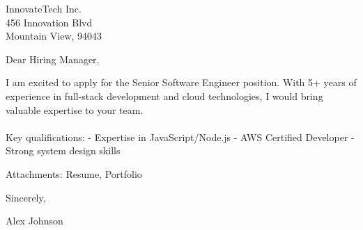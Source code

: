 \documentclass[11pt,a4paper]{letter}
\begin{document}
\begin{letter}{
InnovateTech Inc.\\
456 Innovation Blvd\\
Mountain View, 94043
}

\address{
Alex Johnson\\
123 Tech Street\\
San Francisco, 94105\\
+1 (555) 123-4567\\
\href{mailto:alex.johnson@example.com}{alex.johnson@example.com}
}

\date{June 15, 2023}

\opening{Dear Hiring Manager,}

I am excited to apply for the Senior Software Engineer position. With 5+ years of experience in full-stack development and cloud technologies, I would bring valuable expertise to your team.\\
\\
Key qualifications: - Expertise in JavaScript/Node.js - AWS Certified Developer - Strong system design skills

\vspace{\baselineskip}
\noindent Attachments: Resume, Portfolio

\closing{Sincerely,}

\vspace{0.5in}
Alex Johnson

\end{letter}
\end{document}
